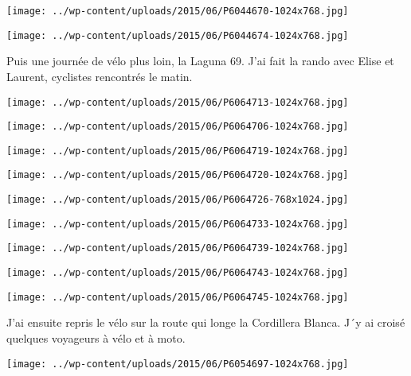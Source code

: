 \centerline{\texttt{[image: ../wp-content/uploads/2015/06/P6044670-1024x768.jpg]} } 
 \newline
 \newline
\centerline{\texttt{[image: ../wp-content/uploads/2015/06/P6044674-1024x768.jpg]} } 
 \newline
 Puis une journée de vélo plus loin, la Laguna 69. J'ai fait la rando avec Elise et Laurent, cyclistes rencontrés le matin. \newline
 \newline
\centerline{\texttt{[image: ../wp-content/uploads/2015/06/P6064713-1024x768.jpg]} } 
 \newline
 \newline
\centerline{\texttt{[image: ../wp-content/uploads/2015/06/P6064706-1024x768.jpg]} } 
 \newline
 \newline
\centerline{\texttt{[image: ../wp-content/uploads/2015/06/P6064719-1024x768.jpg]} } 
 \newline
 \newline
\centerline{\texttt{[image: ../wp-content/uploads/2015/06/P6064720-1024x768.jpg]} } 
 \newline
 \newline
\centerline{\texttt{[image: ../wp-content/uploads/2015/06/P6064726-768x1024.jpg]} } 
 \newline
 \newline
\centerline{\texttt{[image: ../wp-content/uploads/2015/06/P6064733-1024x768.jpg]} } 
 \newline
 \newline
\centerline{\texttt{[image: ../wp-content/uploads/2015/06/P6064739-1024x768.jpg]} } 
 \newline
 \newline
\centerline{\texttt{[image: ../wp-content/uploads/2015/06/P6064743-1024x768.jpg]} } 
 \newline
 \newline
\centerline{\texttt{[image: ../wp-content/uploads/2015/06/P6064745-1024x768.jpg]} } 
 \newline
 J'ai ensuite repris le vélo sur la route qui longe la Cordillera Blanca. J´y ai croisé quelques voyageurs à vélo et à moto. \newline
 \newline
\centerline{\texttt{[image: ../wp-content/uploads/2015/06/P6054697-1024x768.jpg]} } 
